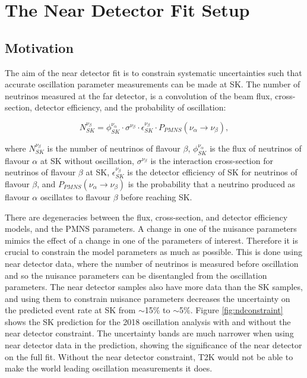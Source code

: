 \newpage
\newpage
\chapter{The Near Detector Fit Setup}\label{sec:FitSetup}
\section{Motivation}

The aim of the near detector fit is to constrain systematic uncertainties such that accurate oscillation parameter measurements can be made at SK. The number of neutrinos measured at the far detector, is a convolution of the beam flux, cross-section, detector efficiency, and the probability of oscillation:

\begin{equation}
N^{\nu_{\beta}}_{SK} = \phi^{\nu_\alpha}_{SK} \cdot \sigma^{\nu_{\beta}} \cdot \epsilon^{\nu_{\beta}}_{SK} \cdot P_{PMNS}(\nu_{\alpha}\rightarrow\nu_{\beta}),
\end{equation}

where $N^{\nu_\beta}_{SK}$ is the number of neutrinos of flavour $\beta$, $\phi^{\nu_\alpha}_{SK}$ is the flux of neutrinos of flavour $\alpha$ at SK without oscillation, $\sigma^{\nu_{\beta}}$ is the interaction cross-section for neutrinos of flavour $\beta$ at SK, $\epsilon^{\nu_\beta}_{SK} $ is the detector efficiency of SK for neutrinos of flavour $\beta$, and $P_{PMNS}(\nu_{\alpha}\rightarrow\nu_{\beta})$ is the probability that a neutrino produced as flavour $\alpha$ oscillates to flavour $\beta$ before reaching SK.

There are degeneracies between the flux, cross-section, and detector efficiency models, and the PMNS parameters. A change in one of the nuisance parameters mimics the effect of a change in one of the parameters of interest. Therefore it is crucial to constrain the model parameters as much as possible. This is done using near detector data, where the number of neutrinos is measured before oscillation and so the  nuisance parameters can be disentangled from the oscillation parameters. The near detector samples also have more data than the SK samples, and using them to constrain nuisance parameters decreases the uncertainty on the predicted event rate at SK from $\sim$15$\%$ to $\sim$5$\%$. Figure \ref{fig:ndconstraint} shows the SK prediction for the 2018 oscillation analysis with and without the near detector constraint. The uncertainty bands are much narrower when using near detector data in the prediction, showing the significance of the near detector on the full fit. Without the near detector constraint, T2K would not be able to make the world leading oscillation measurements it does.

